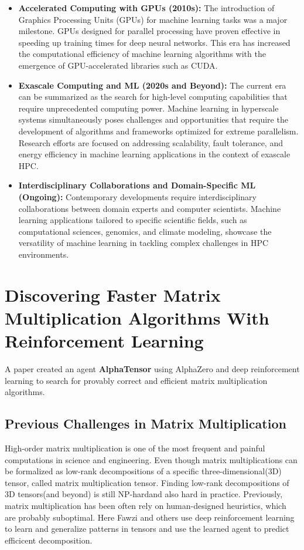 \documentclass[conference]{IEEEtran}
\begin{document}
\begin{itemize}
\item \textbf{Accelerated Computing with GPUs (2010s):} The introduction of Graphics Processing Units (GPUs) for machine learning tasks was a major milestone. GPUs designed for parallel processing have proven effective in speeding up training times for deep neural networks. This era has increased the computational efficiency of machine learning algorithms with the emergence of GPU-accelerated libraries such as CUDA.
\item \textbf{Exascale Computing and ML (2020s and Beyond):} The current era can be summarized as the search for high-level computing capabilities that require unprecedented computing power. Machine learning in hyperscale systems simultaneously poses challenges and opportunities that require the development of algorithms and frameworks optimized for extreme parallelism. Research efforts are focused on addressing scalability, fault tolerance, and energy efficiency in machine learning applications in the context of exascale HPC.
\item \textbf{Interdisciplinary Collaborations and Domain-Specific ML (Ongoing):} Contemporary developments require interdisciplinary collaborations between domain experts and computer scientists. Machine learning applications tailored to specific scientific fields, such as computational sciences, genomics, and climate modeling, showcase the versatility of machine learning in tackling complex challenges in HPC environments.
\end{itemize}

\section{Discovering Faster Matrix Multiplication Algorithms With Reinforcement Learning}
A paper \cite{b3} created an agent \textbf{AlphaTensor} using AlphaZero\cite{b4} and deep reinforcement learning to search for provably correct and efficient matrix multiplication algorithms.
\subsection{Previous Challenges in Matrix Multiplication}
High-order matrix multiplication is one of the most frequent and painful computations in science and engineering. Even though matrix multiplications can be formalized as low-rank decompositions of a specific three-dimensional(3D) tensor\cite{b5}, called matrix multiplication tensor. Finding low-rank decompositions of 3D tensors(and beyond) is still NP-hard\cite{b6}and also hard in practice. Previously, matrix multiplication has been often rely on human-designed heuristics, which are probably suboptimal. Here Fawzi and others use deep reinforcement learning to learn and generalize patterns in tensors and use the learned agent to predict efficicent decomposition.
\end{document}
